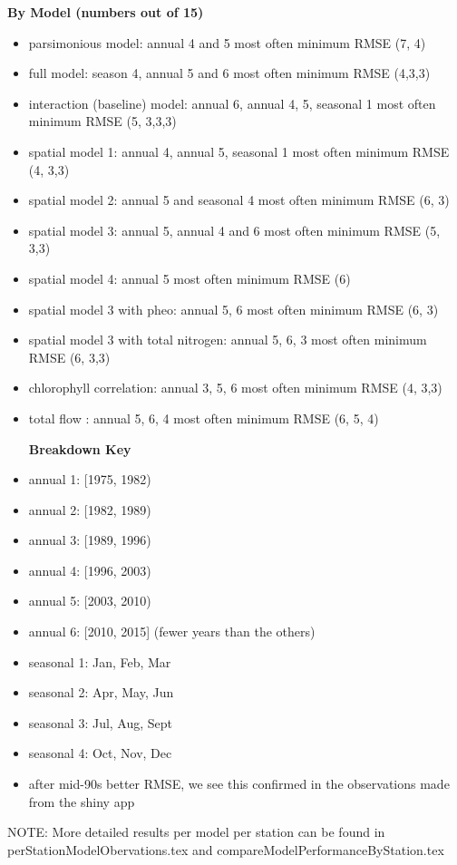 \documentclass[12pt]{amsart}
\begin{document}
\textbf{By Model (numbers out of 15)}
\begin{itemize}
\item parsimonious model: annual 4 and 5 most often minimum RMSE (7, 4)
\item full model: season 4, annual 5 and 6 most often minimum RMSE (4,3,3)
\item interaction (baseline) model: annual 6, annual 4, 5, seasonal 1 most often minimum RMSE (5, 3,3,3)
\item spatial model 1: annual 4, annual 5, seasonal 1 most often minimum RMSE (4, 3,3)
\item spatial model 2: annual 5 and seasonal 4 most often minimum RMSE (6, 3)
\item spatial model 3: annual 5, annual 4 and 6 most often minimum RMSE (5, 3,3)
\item spatial model 4: annual 5 most often minimum RMSE (6)
\item spatial model 3 with pheo: annual 5, 6 most often minimum RMSE (6, 3)
\item spatial model 3 with total nitrogen: annual 5, 6, 3 most often minimum RMSE (6, 3,3)
\item chlorophyll correlation: annual 3, 5, 6 most often minimum RMSE (4, 3,3)
\item total flow : annual 5, 6, 4 most often minimum RMSE (6, 5, 4)

\textbf{Breakdown Key}
\item annual 1: [1975, 1982)
\item annual 2: [1982, 1989)
\item annual 3: [1989, 1996)
\item annual 4: [1996, 2003)
\item annual 5: [2003, 2010)
\item annual 6: [2010, 2015] (fewer years than the others)
\item seasonal 1: Jan, Feb, Mar
\item seasonal 2: Apr, May, Jun
\item seasonal 3: Jul, Aug, Sept
\item seasonal 4: Oct, Nov, Dec
\item after mid-90s better RMSE, we see this confirmed in the observations made from the shiny app
\end{itemize}


NOTE: More detailed results per model per station can be found in perStationModelObervations.tex and compareModelPerformanceByStation.tex
\end{document}
